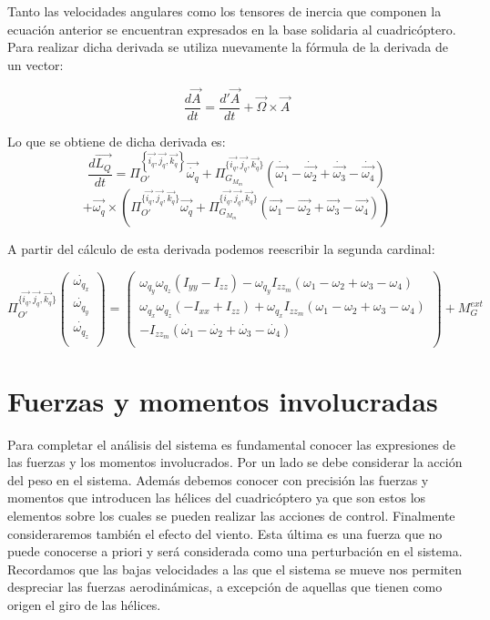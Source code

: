 \documentclass[main]{subfiles}
\begin{document}
Tanto las velocidades angulares como los tensores de inercia que componen la ecuaci\'on anterior se encuentran expresados en la base solidaria al cuadric\'optero. Para realizar dicha derivada se utiliza nuevamente la f\'ormula de la derivada de un vector:

$$\frac{d\vec{A}}{dt} =\frac{d\prime\vec{A}}{dt}+\vec{\Omega}\times\vec{A} $$

Lo que se obtiene de dicha derivada es:
$$
\frac{d\vec{L_Q}}{dt} = \Pi_{O\prime}^{\left\lbrace\vec{i_q}, \vec{j_q}, \vec{k_q}\right\rbrace}\vec{\dot{\omega_q}}+\Pi_{G_{M_{m}}}^{\{\vec{i_q}, \vec{j_q}, \vec{k_q}\}}(\dot{\vec{\omega_1}}-\dot{\vec{\omega_2}}+\dot{\vec{\omega_3}}-\dot{\vec{\omega_4}})$$$$
+\vec{\omega_q}\times(\Pi_{O\prime}^{\{\vec{i_q}, \vec{j_q}, \vec{k_q}\}}\vec{\omega_q}+\Pi_{G_{M_{m}}}^{\{\vec{i_q}, \vec{j_q}, \vec{k_q}\}}(\vec{\omega_1}-\vec{\omega_2}+\vec{\omega_3}-\vec{\omega_4}))$$

A partir del c\'alculo de esta derivada podemos reescribir la segunda cardinal:

$$ \Pi_{O\prime}^{\{\vec{i_q}, \vec{j_q}, \vec{k_q}\}}\left(\begin{array}{c}
\dot{\omega_{q_x}}\\
\dot{\omega_{q_y}}\\
\dot{\omega_{q_z}}\\
\end{array}\right) = \left(\begin{array}{c}
\omega_{q_y}\omega_{q_z}(I_{yy}-I_{zz})-\omega_{q_y}I_{zz_m}(\omega_1-\omega_2+\omega_3-\omega_4)\\

\omega_{q_x}\omega_{q_z}(-I_{xx}+I_{zz})+\omega_{q_x}I_{zz_m}(\omega_1-\omega_2+\omega_3-\omega_4)\\

-I_{zz_m}(\dot{\omega_1}-\dot{\omega_2}+\dot{\omega_3}-\dot{\omega_4})\\

\end{array}\right) + M_G^{ext}$$


\section{Fuerzas y momentos involucradas}
\label{FYT}

Para completar el an\'alisis del sistema es fundamental conocer las expresiones de las fuerzas y los momentos involucrados. Por un lado se debe considerar la acci\'on del peso en el sistema. Adem\'as debemos conocer con precisi\'on las fuerzas y momentos que introducen las h\'elices del cuadric\'optero ya que son estos los elementos sobre los cuales se pueden realizar las acciones de control. Finalmente consideraremos tambi\'en el efecto del viento. Esta \'ultima es una fuerza que no puede conocerse a priori y ser\'a considerada como una perturbaci\'on en el sistema. Recordamos que las bajas velocidades a las que el sistema se mueve nos permiten despreciar las fuerzas aerodin\'amicas, a excepci\'on de aquellas que tienen como origen el giro de las h\'elices.
\end{document}
